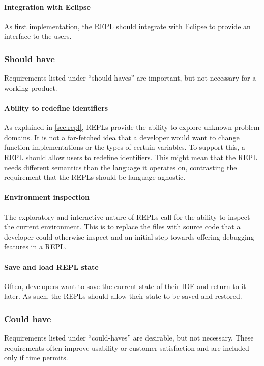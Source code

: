 \paragraph{Integration with Eclipse} As first implementation, the REPL should
integrate with Eclipse to provide an interface to the users.

\subsubsection{Should have}

Requirements listed under ``should-haves'' are important, but not necessary for
a working product.

\paragraph{Ability to redefine identifiers} As explained in \cref{sec:repl},
REPLs provide the ability to explore unknown problem domains. It is not a
far-fetched idea that a developer would want to change function implementations
or the types of certain variables. To support this, a REPL should allow users to
redefine identifiers. This might mean that the REPL needs different semantics
than the language it operates on, contrasting the requirement that the REPLs
should be language-agnostic.

\paragraph{Environment inspection} The exploratory and interactive nature of
REPLs call for the ability to inspect the current environment. This is to
replace the files with source code that a developer could otherwise inspect and
an initial step towards offering debugging features in a REPL.

\paragraph{Save and load REPL state} Often, developers want to save the current
state of their IDE and return to it later. As such, the REPLs should allow their
state to be saved and restored.

\subsubsection{Could have}

Requirements listed under ``could-haves'' are desirable, but not necessary.
These requirements often improve usability or customer satisfaction and are
included only if time permits.

